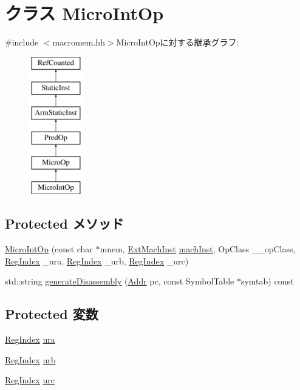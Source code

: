 \hypertarget{classArmISA_1_1MicroIntOp}{
\section{クラス MicroIntOp}
\label{classArmISA_1_1MicroIntOp}
}


{\ttfamily \#include $<$macromem.hh$>$}MicroIntOpに対する継承グラフ:\begin{figure}[H]
\begin{center}
\leavevmode
\includegraphics[height=6cm]{classArmISA_1_1MicroIntOp}
\end{center}
\end{figure}
\subsection*{Protected メソッド}
\begin{DoxyCompactItemize}
\item 
\hyperlink{classArmISA_1_1MicroIntOp_a5da9f4c4044633746772068d6b292e51}{MicroIntOp} (const char $\ast$mnem, \hyperlink{classStaticInst_a5605d4fc727eae9e595325c90c0ec108}{ExtMachInst} \hyperlink{classStaticInst_a744598b194ca3d4201d9414ce4cc4af4}{machInst}, OpClass \_\-\_\-opClass, \hyperlink{classStaticInst_a36d25e03e43fa3bb4c5482cbefe5e0fb}{RegIndex} \_\-ura, \hyperlink{classStaticInst_a36d25e03e43fa3bb4c5482cbefe5e0fb}{RegIndex} \_\-urb, \hyperlink{classStaticInst_a36d25e03e43fa3bb4c5482cbefe5e0fb}{RegIndex} \_\-urc)
\item 
std::string \hyperlink{classArmISA_1_1MicroIntOp_a95d323a22a5f07e14d6b4c9385a91896}{generateDisassembly} (\hyperlink{classm5_1_1params_1_1Addr}{Addr} pc, const SymbolTable $\ast$symtab) const 
\end{DoxyCompactItemize}
\subsection*{Protected 変数}
\begin{DoxyCompactItemize}
\item 
\hyperlink{classStaticInst_a36d25e03e43fa3bb4c5482cbefe5e0fb}{RegIndex} \hyperlink{classArmISA_1_1MicroIntOp_a8e6cd3e234a4950e7a1a05f1b24cfee0}{ura}
\item 
\hyperlink{classStaticInst_a36d25e03e43fa3bb4c5482cbefe5e0fb}{RegIndex} \hyperlink{classArmISA_1_1MicroIntOp_a3771d4e6da84a09dbf436d6b1af2be46}{urb}
\item 
\hyperlink{classStaticInst_a36d25e03e43fa3bb4c5482cbefe5e0fb}{RegIndex} \hyperlink{classArmISA_1_1MicroIntOp_a7b2bf3346575e8b24bdd921acf571967}{urc}
\end{DoxyCompactItemize}


